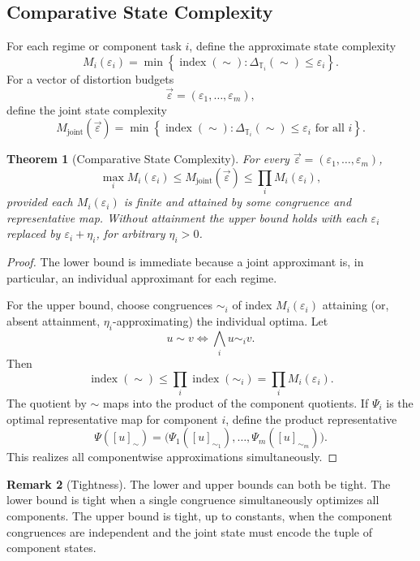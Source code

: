 \documentclass[12pt]{article}
\newtheorem{theorem}{Theorem}[section]
\theoremstyle{definition}
\newtheorem{remark}[theorem]{Remark}
\begin{document}
\subsection{Comparative State Complexity}
\label{subsec:comparative}

For each regime or component task $i$, define the approximate state complexity
\[
M_i(\varepsilon_i)
=
\min
\left\{
\operatorname{index}(\sim):
\Delta_{\mathbb T_i}(\sim)\le\varepsilon_i
\right\}.
\]
For a vector of distortion budgets
\[
\vec\varepsilon=(\varepsilon_1,\dots,\varepsilon_m),
\]
define the joint state complexity
\[
M_{\mathrm{joint}}(\vec\varepsilon)
=
\min
\left\{
\operatorname{index}(\sim):
\Delta_{\mathbb T_i}(\sim)\le\varepsilon_i
\text{ for all }i
\right\}.
\]

\begin{theorem}[Comparative State Complexity]
\label{thm:comparative}
For every $\vec\varepsilon=(\varepsilon_1,\dots,\varepsilon_m)$,
\[
\max_i M_i(\varepsilon_i)
\le
M_{\mathrm{joint}}(\vec\varepsilon)
\le
\prod_i M_i(\varepsilon_i),
\]
provided each $M_i(\varepsilon_i)$ is finite and attained by some congruence
and representative map.  Without attainment the upper bound holds with each
$\varepsilon_i$ replaced by $\varepsilon_i+\eta_i$, for arbitrary
$\eta_i>0$.
\end{theorem}

\begin{proof}
The lower bound is immediate because a joint approximant is, in particular, an
individual approximant for each regime.

For the upper bound, choose congruences $\sim_i$ of index
$M_i(\varepsilon_i)$ attaining (or, absent attainment, $\eta_i$-approximating)
the individual optima.  Let
\[
u\sim v
\iff
\bigwedge_i u\sim_i v.
\]
Then
\[
\operatorname{index}(\sim)
\le
\prod_i\operatorname{index}(\sim_i)
=
\prod_i M_i(\varepsilon_i).
\]
The quotient by $\sim$ maps into the product of the component quotients.  If
$\Psi_i$ is the optimal representative map for component $i$, define the
product representative
\[
\Psi([u]_\sim)
=
\bigl(
\Psi_1([u]_{\sim_1}),
\dots,
\Psi_m([u]_{\sim_m})
\bigr).
\]
This realizes all componentwise approximations simultaneously.
\end{proof}

\begin{remark}[Tightness]
\label{rem:comparative-tightness}
The lower and upper bounds can both be tight.  The lower bound is tight when a
single congruence simultaneously optimizes all components.  The upper bound is
tight, up to constants, when the component congruences are independent and the
joint state must encode the tuple of component states.
\end{remark}
\end{document}
